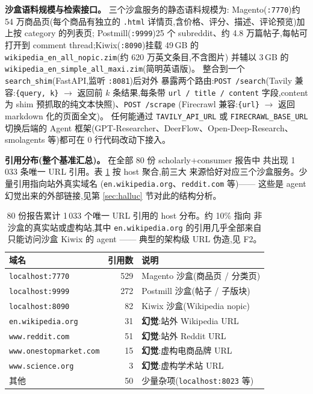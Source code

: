 \documentclass[UTF8,11pt]{ctexart}
\begin{document}
\textbf{沙盒语料规模与检索接口。} 三个沙盒服务的静态语料规模为:
Magento(\texttt{:7770})约 54 万商品页(每个商品有独立的
\texttt{.html} 详情页,含价格、评分、描述、评论预览)加上按 category 的列表页;
Postmill(\texttt{:9999})25 个 subreddit、约 4.8 万篇帖子,每帖可打开到
comment thread;Kiwix(\texttt{:8090})挂载 49\,GB 的
\texttt{wikipedia\_en\_all\_nopic.zim}(约 620 万英文条目,不含图片)
并辅以 3\,GB 的 \texttt{wikipedia\_en\_simple\_all\_maxi.zim}(简明英语版)。
整合到一个 \texttt{search\_shim}(FastAPI,监听 \texttt{:8081})后对外
暴露两个路由:\texttt{POST /search}(Tavily 兼容:\texttt{\{query,
k\}} $\to$ 返回前 $k$ 条结果,每条带 \texttt{url / title / content}
字段,content 为 shim 预抓取的纯文本快照)、\texttt{POST /scrape}
(Firecrawl 兼容:\texttt{\{url\}} $\to$ 返回 markdown 化的页面全文)。
任何能通过 \texttt{TAVILY\_API\_URL} 或 \texttt{FIRECRAWL\_BASE\_URL}
切换后端的 Agent 框架(GPT-Researcher、DeerFlow、Open-Deep-Research、
smolagents 等)都可在 0 行代码改动下接入。

\textbf{引用分布(整个基准汇总)。} 在全部 80 份 scholarly+consumer 报告中
共出现 1\,033 条唯一 URL 引用。表 \ref{tab:domains} 按 host 聚合,前三大
来源恰好对应三个沙盒服务。少量引用指向站外真实域名
(\texttt{en.wikipedia.org}、\texttt{reddit.com} 等)—— 这些是 agent
幻觉出来的外部链接,见第 \ref{sec:halluc} 节对此的结构分析。

\begin{table}[h]
  \centering
  \small
  \begin{tabular}{lrl}
    \toprule
    域名 & 引用数 & 说明 \\
    \midrule
    \texttt{localhost:7770}       & 529 & Magento 沙盒(商品页 / 分类页) \\
    \texttt{localhost:9999}       & 272 & Postmill 沙盒(帖子 / 子版块) \\
    \texttt{localhost:8090}       &  82 & Kiwix 沙盒(Wikipedia nopic) \\
    \texttt{en.wikipedia.org}     &  31 & \textbf{幻觉}:站外 Wikipedia URL \\
    \texttt{www.reddit.com}       &  51 & \textbf{幻觉}:站外 Reddit URL \\
    \texttt{www.onestopmarket.com}&  15 & \textbf{幻觉}:虚构电商品牌 URL \\
    \texttt{www.science.org}      &   3 & \textbf{幻觉}:虚构学术站 URL \\
    其他                          &  50 & 少量杂项(\texttt{localhost:8023} 等) \\
    \bottomrule
  \end{tabular}
  \caption{80 份报告累计 1\,033 个唯一 URL 引用的 host 分布。约 10\% 指向
    非沙盒的真实站或虚构站,其中 \texttt{en.wikipedia.org} 的引用几乎全部来自
    只能访问沙盒 Kiwix 的 agent —— 典型的架构级 URL 伪造,见 F2。}
  \label{tab:domains}
\end{table}
\end{document}
